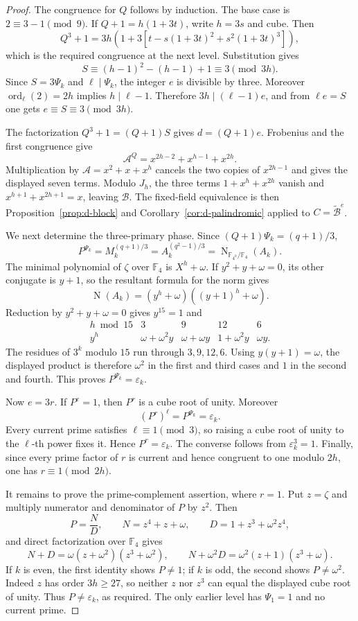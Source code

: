 \documentclass[11pt]{article}
\theoremstyle{definition}
\theoremstyle{remark}
\begin{document}
\begin{proof}
The congruence for $Q$ follows by induction.  The base case is
$2\equiv3-1\pmod9$.  If
$Q+1=h(1+3t)$, write $h=3s$ and cube.  Then
\[
 Q^3+1
 =3h\left(1+3\left[
 t-s(1+3t)^2+s^2(1+3t)^3
 \right]\right),
\]
which is the required congruence at the next level.  Substitution gives
\[
 S\equiv(h-1)^2-(h-1)+1\equiv3\pmod {3h}.
\]
Since $S=3\Psi_k$ and $\ell\mid\Psi_k$, the integer $e$ is divisible by
three.  Moreover $\operatorname{ord}_\ell(2)=2h$ implies
$h\mid\ell-1$.  Therefore $3h\mid(\ell-1)e$, and from $\ell e=S$ one gets
$e\equiv S\equiv3\pmod {3h}$.

The factorization $Q^3+1=(Q+1)S$ gives $d=(Q+1)e$.  Frobenius and the first
congruence give
\[
 \mathcal A^Q
 =x^{2h-2}+x^{h-1}+x^{2h}.
\]
Multiplication by $\mathcal A=x^2+x+x^h$ cancels the two copies of
$x^{2h-1}$ and gives the displayed seven terms.  Modulo $J_h$, the three
terms $1+x^h+x^{2h}$ vanish and
$x^{h+1}+x^{2h+1}=x$, leaving $\mathcal B$.  The fixed-field equivalence is
then Proposition~\ref{prop:d-block} and
Corollary~\ref{cor:d-palindromic} applied to
$C=\widetilde{\mathcal B}^{e}$.

We next determine the three-primary phase.  Since
$(Q+1)\Psi_k=(q+1)/3$,
\[
 P^{\Psi_k}
 =M_k^{(q+1)/3}
 =A_k^{(q^2-1)/3}
 =\operatorname N_{\mathbb F_{4^h}/\mathbb F_4}(A_k).
\]
The minimal polynomial of $\zeta$ over $\mathbb F_4$ is $X^h+\omega$.
If $y^2+y+\omega=0$, its other conjugate is $y+1$, so the resultant formula
for the norm gives
\[
 \operatorname N(A_k)
 =(y^h+\omega)((y+1)^h+\omega).
\]
Reduction by $y^2+y+\omega=0$ gives $y^{15}=1$ and
\[
 \begin{array}{c|cccc}
  h\bmod15&3&9&12&6\\ \hline
  y^h&\omega+\omega^2y&\omega+\omega y&1+\omega^2y&\omega y.
 \end{array}
\]
The residues of $3^k$ modulo $15$ run through $3,9,12,6$.  Using
$y(y+1)=\omega$, the displayed product is therefore $\omega^2$ in the
first and third cases and $1$ in the second and fourth.  This proves
$P^{\Psi_k}=\varepsilon_k$.

Now $e=3r$.  If $P^e=1$, then $P^r$ is a cube root of unity.  Moreover
\[
 (P^r)^\ell=P^{\Psi_k}=\varepsilon_k.
\]
Every current prime satisfies $\ell\equiv1\pmod3$, so raising a cube root
of unity to the $\ell$-th power fixes it.  Hence $P^r=\varepsilon_k$.
The converse follows from $\varepsilon_k^3=1$.  Finally, since every prime
factor of $r$ is current and hence congruent to one modulo $2h$, one has
$r\equiv1\pmod {2h}$.

It remains to prove the prime-complement assertion, where $r=1$.  Put
$z=\zeta$ and multiply numerator and denominator of $P$ by $z^2$.  Then
\[
 P=\frac{N}{D},\qquad
 N=z^4+z+\omega,\qquad
 D=1+z^3+\omega^2z^4,
\]
and direct factorization over $\mathbb F_4$ gives
\[
 N+D=\omega(z+\omega^2)(z^3+\omega^2),
 \qquad
 N+\omega^2D=\omega^2(z+1)(z^3+\omega).
\]
If $k$ is even, the first identity shows $P\ne1$; if $k$ is odd, the second
shows $P\ne\omega^2$.  Indeed $z$ has order $3h\ge27$, so neither $z$ nor
$z^3$ can equal the displayed cube root of unity.  Thus
$P\ne\varepsilon_k$, as required.  The only earlier level has
$\Psi_1=1$ and no current prime.
\end{proof}
\end{document}

